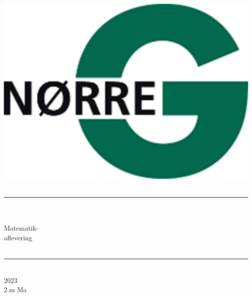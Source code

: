 \documentclass[12pt,x11names,a4paper]{article}
\begin{document}
%

\begin{titlepage}

\begin{minipage}{0.27\textwidth}

\end{minipage}
\begin{minipage}{0.73\textwidth}
\begin{center}
\phantom{h} \vspace{1cm}\\
\hspace{4cm}
\includegraphics[scale = 1]{Billeder/Norreg.png} \\
\phantom{h} \vspace{5cm}\\
\rule{0.7\textwidth}{0.3mm}\\
\phantom{h}\\
{\fontsize{50}{60}\selectfont Matematik-\\aflevering}\\
\phantom{h}\\
\rule{0.7\textwidth}{0.3mm}\\
\Large 2023\\
\Large 2.m Ma

\end{center}
\end{minipage}
\end{titlepage}
\end{document}
